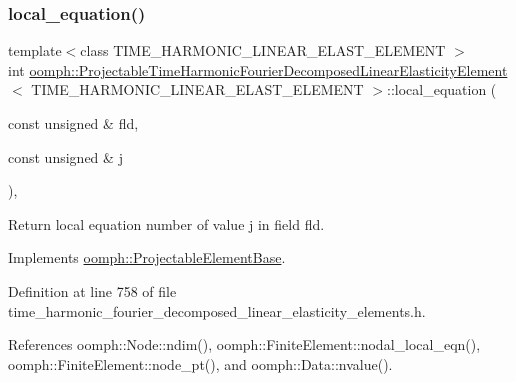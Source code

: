\subsubsection{\texorpdfstring{local\+\_\+equation()}{local\_equation()}}
{\footnotesize\ttfamily template$<$class T\+I\+M\+E\+\_\+\+H\+A\+R\+M\+O\+N\+I\+C\+\_\+\+L\+I\+N\+E\+A\+R\+\_\+\+E\+L\+A\+S\+T\+\_\+\+E\+L\+E\+M\+E\+NT $>$ \\
int \hyperlink{classoomph_1_1ProjectableTimeHarmonicFourierDecomposedLinearElasticityElement}{oomph\+::\+Projectable\+Time\+Harmonic\+Fourier\+Decomposed\+Linear\+Elasticity\+Element}$<$ T\+I\+M\+E\+\_\+\+H\+A\+R\+M\+O\+N\+I\+C\+\_\+\+L\+I\+N\+E\+A\+R\+\_\+\+E\+L\+A\+S\+T\+\_\+\+E\+L\+E\+M\+E\+NT $>$\+::local\+\_\+equation (\begin{DoxyParamCaption}\item[{const unsigned \&}]{fld,  }\item[{const unsigned \&}]{j }\end{DoxyParamCaption})\hspace{0.3cm}{\ttfamily [inline]}, {\ttfamily [virtual]}}



Return local equation number of value j in field fld. 



Implements \hyperlink{classoomph_1_1ProjectableElementBase_ac5c27ae929ff636dc7747fe23fd4f738}{oomph\+::\+Projectable\+Element\+Base}.



Definition at line 758 of file time\+\_\+harmonic\+\_\+fourier\+\_\+decomposed\+\_\+linear\+\_\+elasticity\+\_\+elements.\+h.



References oomph\+::\+Node\+::ndim(), oomph\+::\+Finite\+Element\+::nodal\+\_\+local\+\_\+eqn(), oomph\+::\+Finite\+Element\+::node\+\_\+pt(), and oomph\+::\+Data\+::nvalue().

\mbox{\label{classoomph_1_1ProjectableTimeHarmonicFourierDecomposedLinearElasticityElement_aee73e1027994f0c4908d048a930c3992}} 
